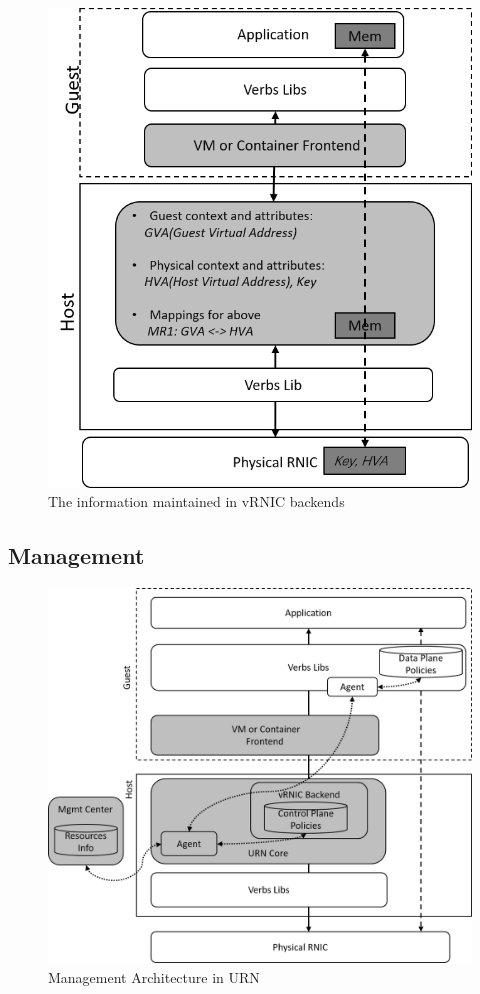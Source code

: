 \begin{figure}[!ht]
	\centering
	\includegraphics[width=0.8\linewidth]{images/vrnic-backend.png}
	\caption{The information maintained in vRNIC backends}
	\label{fig:route-config}
\end{figure}


\subsection{Management}

\begin{figure}[!ht]
	\centering
	\includegraphics[width=1\linewidth]{images/urn-interface.png}
	\caption{Management Architecture in URN}
	\label{fig:framework-overview}
\end{figure}

